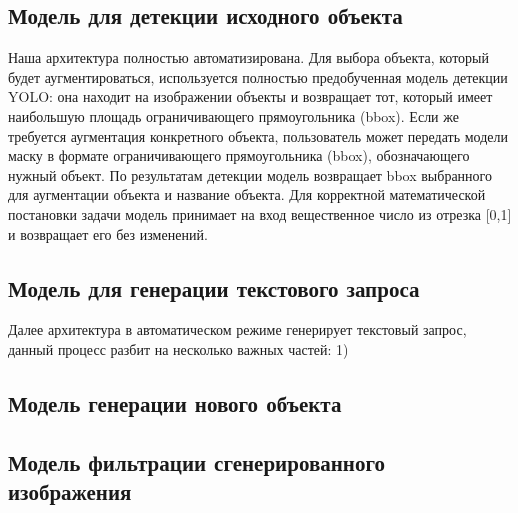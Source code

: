 \subsection{Модель для детекции исходного объекта}
\label{binary}
Наша архитектура полностью автоматизирована. Для выбора объекта, который будет аугментироваться, используется полностью предобученная модель детекции YOLO: она находит на изображении объекты и возвращает тот, который имеет наибольшую площадь ограничивающего прямоугольника (bbox). Если же требуется аугментация конкретного объекта, пользователь может передать модели маску в формате ограничивающего прямоугольника (bbox), обозначающего нужный объект. По результатам детекции модель возвращает bbox выбранного для аугментации объекта и название объекта. Для корректной математической постановки задачи модель принимает на вход вещественное число из отрезка 
[0,1] и возвращает его без изменений.



\subsection{Модель для генерации текстового запроса}
Далее архитектура в автоматическом режиме генерирует текстовый запрос, данный процесс разбит на несколько важных частей:
1) 



\subsection{Модель генерации нового объекта}

\subsection{Модель фильтрации сгенерированного изображения}
